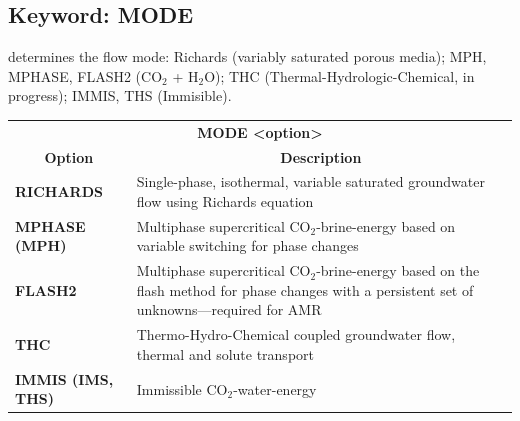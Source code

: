 \documentclass[12pt]{article}
\begin{document}

\newpage
\protect\hypertarget{target_mode}{}

\subsection{Keyword: MODE}

 determines the flow mode: Richards (variably saturated porous media); MPH, \linebreak MPHASE, FLASH2 (CO$_2$ + H$_2$O); THC (Thermal-Hydrologic-Chemical, in pro\-gress); IMMIS, THS (Immisible).

\begin{tabularx}{\linewidth}{lX}
\multicolumn{2}{c}{\bf MODE <option>}\\
\multicolumn{1}{c}{\bf Option} & \multicolumn{1}{c}{\bf Description}\\
\bf RICHARDS &Single-phase, isothermal, variable saturated groundwater flow using Richards equation\\
\bf MPHASE (MPH) &Multiphase supercritical CO$_2$-brine-energy based on variable switching for phase changes\\
\bf FLASH2 &Multiphase supercritical CO$_2$-brine-energy based on the flash method for phase changes with a persistent set of unknowns---required for AMR\\
\bf THC &Thermo-Hydro-Chemical coupled groundwater flow, thermal and solute transport\\
\bf IMMIS (IMS, THS) &Immissible CO$_2$-water-energy\\
\end{tabularx}
\end{document}

